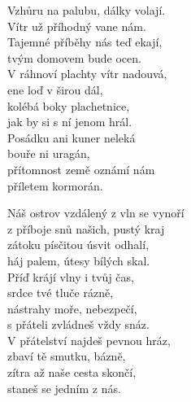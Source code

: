 
\ve{}
Vzhůru na palubu, dálky volají.\\
Vítr už příhodný vane nám.\\
Tajemné příběhy nás teď ekají,\\
tvým domovem bude ocen.\\
V ráhnoví plachty vítr nadouvá,\\
ene loď v širou dál,\\
kolébá boky plachetnice,\\
jak by si s ní jenom hrál.\\
Posádku ani kuner neleká\\
bouře ni uragán,\\
přítomnost země oznámí nám\\
příletem kormorán.

\ve{}
Náš ostrov vzdálený z vln se vynoří\\
z příboje snů našich, pustý kraj\\
zátoku písčitou úsvit odhalí,\\
háj palem, útesy bílých skal.\\
Příď krájí vlny i tvůj čas,\\
srdce tvé tluče rázně,\\
nástrahy moře, nebezpečí,\\
s přáteli zvládneš vždy snáz.\\
V přátelství najdeš pevnou hráz,\\
zbaví tě smutku, bázně,\\
zítra až naše cesta skončí,\\
staneš se jedním z nás.

\esong